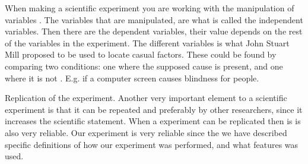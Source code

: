 When making a scientific experiment you are working with the manipulation of variables \citep[page 21]{Design}. The variables that are manipulated, are what is called the independent variables. Then there are the dependent variables, their value depends on the rest of the variables in the experiment\citep[page 21]{Design}. The different variables is what John Stuart Mill proposed to be used to locate casual factors. These could be found by comparing two conditions: one where the supposed cause is present, and one where it is not \citep[page 20]{Design}. E.g. if a computer screen causes blindness for people.

Replication of the experiment.
Another very important element to a scientific experiment is that it can be repeated and preferably by other researchers, since it increases the scientific statement\citep[page 26]{Design}. When a experiment can be replicated then is is also very reliable. 
Our experiment is very reliable since the we have described specific definitions of how our experiment was performed, and what features was used.
